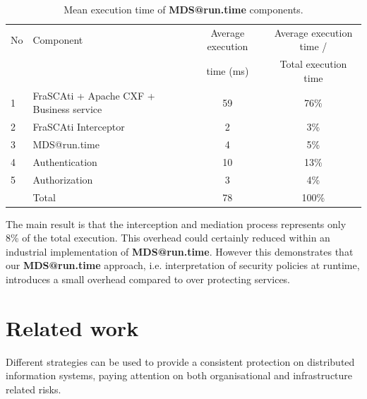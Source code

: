 \documentclass[runningheads,a4paper]{llncs}
\begin{document}
\begin{table}

\caption{Mean execution time of \textbf{MDS@run.time} components.}
\begin{tabular}{|p{0.4cm}|p{3.8cm}|c|c|}
\hline
No & Component &   Average execution  &  Average execution time / \\
 &  &   time (ms) &  Total execution time \\
  \hline
 1 & FraSCAti + Apache CXF + Business service & 59 &  76\%\\
2 & FraSCAti Interceptor & 2 &  3\%\\ 
3 & MDS@run.time & 4 &  5\%\\
 4 & Authentication& 10 & 13\%\\
5 & Authorization & 3 & 4\%\\
 \hline
 &  Total & 78 & 100\%\\
    \hline

\end{tabular}
\end{table}

The main result is that the interception and mediation process represents only 8\% of the total execution.
This overhead could certainly reduced within an industrial implementation of \textbf{MDS@run.time}.
However this demonstrates that our \textbf{MDS@run.time} approach, i.e. interpretation of security policies at runtime, introduces a small overhead compared to over protecting services.

\section{Related work}
\label{relatedwork}
Different strategies can be used to provide a consistent protection on distributed information systems, paying attention on both organisational and infrastructure related risks. 
\end{document}
